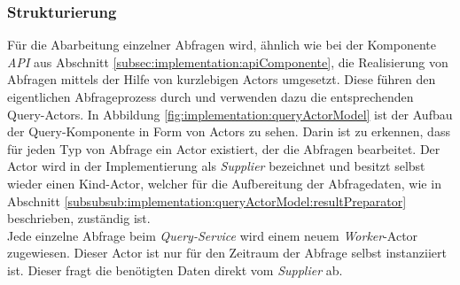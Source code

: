 \subsubsection{Strukturierung}
Für die Abarbeitung einzelner Abfragen wird, ähnlich wie bei der Komponente \textit{API} aus Abschnitt \ref{subsec:implementation:apiComponente}, die Realisierung von Abfragen mittels der Hilfe von kurzlebigen Actors umgesetzt. Diese führen den eigentlichen Abfrageprozess durch und verwenden dazu die entsprechenden Query-Actors. In Abbildung \ref{fig:implementation:queryActorModel} ist der Aufbau der Query-Komponente in Form von Actors zu sehen. Darin ist zu erkennen, dass für jeden Typ von Abfrage ein Actor existiert, der die Abfragen bearbeitet. 
Der Actor wird in der Implementierung als \textit{Supplier} bezeichnet und besitzt selbst wieder einen Kind-Actor, welcher für die Aufbereitung der Abfragedaten, wie in Abschnitt \ref{subsubsub:implementation:queryActorModel:resultPreparator} beschrieben, zuständig ist. \\
Jede einzelne Abfrage beim \textit{Query-Service} wird einem neuem \textit{Worker}-Actor zugewiesen. Dieser Actor ist nur für den Zeitraum der Abfrage selbst instanziiert ist. Dieser fragt die benötigten Daten direkt vom \textit{Supplier} ab. 













